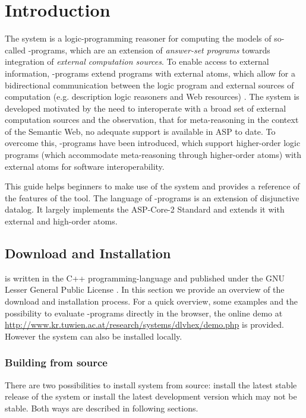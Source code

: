 \documentclass[a4paper, titlepage]{article}
\begin{document}
\section{Introduction} %
\label{sec:intro}
The \dlvhex{} system is a logic-programming reasoner for 
computing the models of so-called \hex{}-programs, which 
are an extension of \emph{answer-set programs} towards 
integration of \emph{external computation sources}. To 
enable access to external information, \hex{}-programs 
extend programs with external atoms, which allow for a 
bidirectional communication between the logic program and 
external sources of computation (e.g. description logic 
reasoners and Web resources) \cite{efkr2012}. The system is 
developed motivated by the need to interoperate with a 
broad set of external computation sources and the 
observation, that for meta-reasoning in the context of the 
Semantic Web, no adequate support is available in ASP to 
date. To overcome this, \hex{}-programs have been 
introduced, which support higher-order logic programs 
(which accommodate meta-reasoning through higher-order 
atoms) with external atoms for software interoperability.

This guide helps beginners to make use of the system and 
provides a reference of the features of the tool. The language of \hex{}-programs is an extension of disjunctive datalog. It largely 
implements the ASP-Core-2 Standard \cite{cffiklrs2013} and 
extends it with external and high-order atoms. 


\subsection{Download and Installation}
\dlvhex{} is written in the C++ programming-language
and published under the GNU Lesser General 
Public License \cite{licnc}. 
In this section we provide an overview of the 
download and installation process. For a quick overview, 
some examples and the possibility to evaluate 
\hex{}-programs directly in the browser, the online demo at 
\url{http://www.kr.tuwien.ac.at/research/systems/dlvhex/demo.php} 
is provided. However the system can also be installed 
locally. 

\subsubsection{Building from source}
There are two possibilities to install \dlvhex{} system 
from source: install the latest stable release of the 
system or install the latest development version which may 
not be stable. Both ways are described in following 
sections.  
\end{document}
